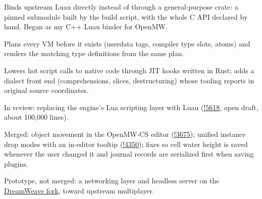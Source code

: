 \documentclass{resume}
\begin{document}
\begin{bullets}
  \item Binds upstream Luau directly instead of through a general-purpose crate: a pinned submodule built by the build script, with the whole C API declared by hand. Began as my C++ Luau binder for OpenMW.
  \item Plans every VM before it exists (userdata tags, compiler type slots, atoms) and renders the matching type definitions from the same plan.
  \item Lowers hot script calls to native code through JIT hooks written in Rust; adds a dialect front end (comprehensions, slices, destructuring) whose tooling reports in original source coordinates.
\end{bullets}

\begin{bullets}
  \item In review: replacing the engine's Lua scripting layer with Luau (\href{https://gitlab.com/OpenMW/openmw/-/merge_requests/5618}{!5618}, open draft, about 100,000 lines).
  \item Merged: object movement in the OpenMW-CS editor (\href{https://gitlab.com/OpenMW/openmw/-/merge_requests/3675}{!3675}); unified instance drop modes with an in-editor tooltip (\href{https://gitlab.com/OpenMW/openmw/-/merge_requests/4350}{!4350}); fixes so cell water height is saved whenever the user changed it and journal records are serialized first when saving plugins.
  \item Prototype, not merged: a networking layer and headless server on the \href{https://github.com/DreamWeave-MP/DreamWeave}{DreamWeave fork}, toward upstream multiplayer.
\end{bullets}
\end{document}
